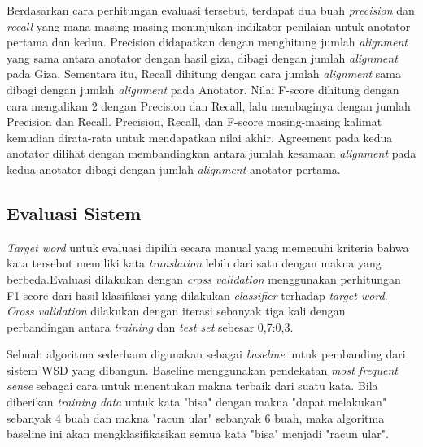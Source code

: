 Berdasarkan cara perhitungan evaluasi tersebut, terdapat dua buah \textit{precision} dan \textit{recall} yang mana masing-masing menunjukan indikator penilaian untuk anotator pertama dan kedua. Precision didapatkan dengan menghitung jumlah \textit{alignment} yang sama antara anotator dengan hasil giza, dibagi dengan jumlah \textit{alignment} pada Giza. Sementara itu, Recall dihitung dengan cara jumlah \textit{alignment} sama dibagi dengan jumlah \textit{alignment} pada Anotator. Nilai F-score dihitung dengan cara mengalikan 2 dengan Precision dan Recall, lalu membaginya dengan jumlah Precision dan Recall. Precision, Recall, dan F-score masing-masing kalimat kemudian dirata-rata untuk mendapatkan nilai akhir. Agreement pada kedua anotator dilihat dengan membandingkan antara jumlah kesamaan \textit{alignment} pada kedua anotator dibagi dengan jumlah \textit{alignment} anotator pertama.

\subsection{Evaluasi Sistem}
\textit{Target word} untuk evaluasi dipilih secara manual yang memenuhi kriteria bahwa kata tersebut memiliki kata \textit{translation} lebih dari satu dengan makna yang berbeda.Evaluasi dilakukan dengan \textit{cross validation} menggunakan perhitungan F1-score dari hasil klasifikasi yang dilakukan \textit{classifier} terhadap \textit{target word}. \textit{Cross validation} dilakukan dengan iterasi sebanyak tiga kali dengan perbandingan antara \textit{training} dan \textit{test set} sebesar 0,7:0,3.

Sebuah algoritma sederhana digunakan sebagai \textit{baseline} untuk pembanding dari sistem WSD yang dibangun. Baseline menggunakan pendekatan \textit{most frequent sense} sebagai cara untuk menentukan makna terbaik dari suatu kata. Bila diberikan \textit{training data} untuk kata "bisa" dengan makna "dapat melakukan" sebanyak 4 buah dan makna "racun ular" sebanyak 6 buah, maka algoritma baseline ini akan mengklasifikasikan semua kata "bisa" menjadi "racun ular".

